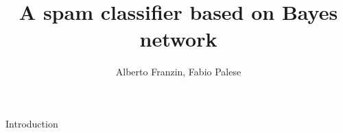 \documentclass[xcolor=x11names,compress]{beamer}
\title{A spam classifier based on Bayes network}
\author{Alberto Franzin, Fabio Palese}
\institute[2013]{Sistemi Intelligenti}
\renewcommand{\(}{\begin{columns}}
\renewcommand{\)}{\end{columns}}
\newcommand{\<}[1]{\begin{column}{#1}}
\renewcommand{\>}{\end{column}}
\begin{document}

\frame{\titlepage}


\begin{frame}{Introduction}
\tableofcontents
\end{frame}

\end{document}
